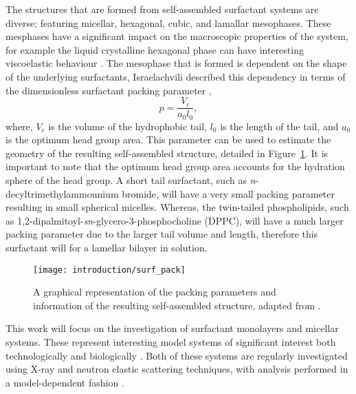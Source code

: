 The structures that are formed from self-assembled surfactant systems are diverse; featuring micellar, hexagonal, cubic, and lamallar mesophases.
These mesphases have a significant impact on the macroscopic properties of the system, for example the liquid crystalline hexagonal phase can have interesting viscoelastic behaviour \cite{jurasin_lamellar_2013,cordobes_linear_1997}.
The mesophase that is formed is dependent on the shape of the underlying surfactants, Israelachvili described this dependency in terms of the dimensionless surfactant packing parameter \cite{israelachvili_intermolecular_2011},
%
\begin{equation}
p = \frac{V_c}{a_0l_0},
\end{equation}
%
where, $V_c$ is the volume of the hydrophobic tail, $l_0$ is the length of the tail, and $a_0$ is the optimum head group area.
This parameter can be used to estimate the geometry of the resulting self-assembled structure, detailed in Figure~\ref{fig:pack}.
It is important to note that the optimum head group area accounts for the hydration sphere of the head group.
A short tail surfactant, such as \emph{n}-decyltrimethylammounium bromide, will have a very small packing parameter resulting in small spherical micelles.
Whereas, the twin-tailed phospholipids, such as 1,2-dipalmitoyl-\emph{sn}-glycero-3-phosphocholine (DPPC), will have a much larger packing parameter due to the larger tail volume and length, therefore this surfactant will for a lamellar bilayer in solution.
%
\begin{figure}
    \centering
    \texttt{[image: introduction/surf\_pack]}
    \caption{A graphical representation of the packing parameters and information of the resulting self-assembled structure, adapted from \cite{israelachvili_intermolecular_2011}.}
    \label{fig:pack}
\end{figure}
%

This work will focus on the investigation of surfactant monolayers and micellar systems.
These represent interesting model systems of significant interest both technologically \cite{anton_reverse_2010,zagnoni_miniaturised_2012} and biologically \cite{kataoka_block_2012,mohwald_phospholipid_1990,kewalramani_effects_2010}.
Both of these systems are regularly investigated using X-ray and neutron elastic scattering techniques, with analysis performed in a model-dependent fashion \cite{pambou_structural_2015,hayward_liquid_2015,rodriguez-loureiro_neutron_2017,hazell_langmuir_2016}.
